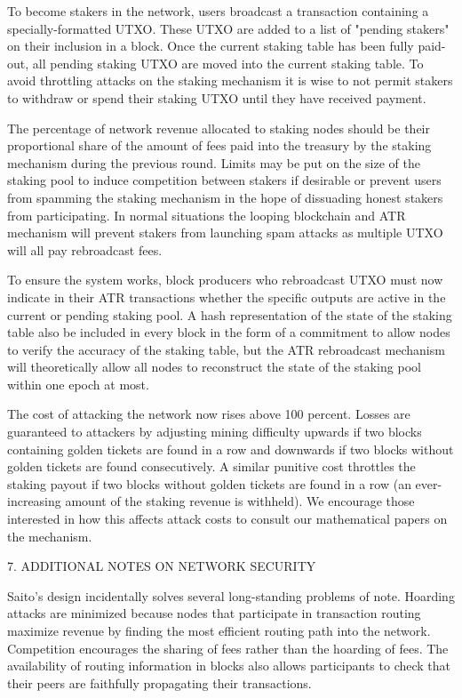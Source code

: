 \documentclass[11pt, oneside]{article}   	%
\begin{document}
\begin{multicols}{2}
To become stakers in the network, users broadcast a transaction containing a specially-formatted UTXO. These UTXO are added to a list of "pending stakers" on their inclusion in a block. Once the current staking table has been fully paid-out, all pending staking UTXO are moved into the current staking table. To avoid throttling attacks on the staking mechanism it is wise to not permit stakers to withdraw or spend their staking UTXO until they have received payment. 

The percentage of network revenue allocated to staking nodes should be their proportional share of the amount of fees paid into the treasury by the staking mechanism during the previous round. Limits may be put on the size of the staking pool to induce competition between stakers if desirable or prevent users from spamming the staking mechanism in the hope of dissuading honest stakers from participating. In normal situations the looping blockchain and ATR mechanism will prevent stakers from launching spam attacks as multiple UTXO will all pay rebroadcast fees.

To ensure the system works, block producers who rebroadcast UTXO must now indicate in their ATR transactions whether the specific outputs are active in the current or pending staking pool. A hash representation of the state of the staking table also be included in every block in the form of a commitment to allow nodes to verify the accuracy of the staking table, but the ATR rebroadcast mechanism will theoretically allow all nodes to reconstruct the state of the staking pool within one epoch at most.

The cost of attacking the network now rises above 100 percent. Losses are guaranteed to attackers by adjusting mining difficulty upwards if two blocks containing golden tickets are found in a row and downwards if two blocks without golden tickets are found consecutively. A similar punitive cost throttles the staking payout if two blocks without golden tickets are found in a row (an ever-increasing amount of the staking revenue is withheld). We encourage those interested in how this affects attack costs to consult our mathematical papers on the mechanism.


7. ADDITIONAL NOTES ON NETWORK SECURITY

Saito's design incidentally solves several long-standing problems of note. Hoarding attacks are minimized because nodes that participate in transaction routing maximize revenue by finding the most efficient routing path into the network. Competition encourages the sharing of fees rather than the hoarding of fees. The availability of routing information in blocks also allows participants to check that their peers are faithfully propagating their transactions.


\end{multicols}
\end{document}
